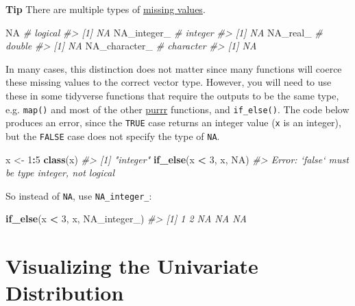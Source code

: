\documentclass[]{book}
\newenvironment{Shaded}{\begin{snugshade}}{\end{snugshade}}
\newcommand{\CommentTok}[1]{\textcolor[rgb]{0.56,0.35,0.01}{\textit{#1}}}
\newcommand{\DecValTok}[1]{\textcolor[rgb]{0.00,0.00,0.81}{#1}}
\newcommand{\KeywordTok}[1]{\textcolor[rgb]{0.13,0.29,0.53}{\textbf{#1}}}
\newcommand{\NormalTok}[1]{#1}
\newcommand{\OperatorTok}[1]{\textcolor[rgb]{0.81,0.36,0.00}{\textbf{#1}}}
\newcommand{\OtherTok}[1]{\textcolor[rgb]{0.56,0.35,0.01}{#1}}
\newcommand{\StringTok}[1]{\textcolor[rgb]{0.31,0.60,0.02}{#1}}
\theoremstyle{definition}
\theoremstyle{definition}
\theoremstyle{definition}
\theoremstyle{remark}
\begin{document}
\textbf{Tip} There are multiple types of
\href{http://r4ds.had.co.nz/vectors.html\#important-types-of-atomic-vector}{missing
values}.

\begin{Shaded}
\begin{Highlighting}[]
\OtherTok{NA}  \CommentTok{# logical}
\CommentTok{#> [1] NA}
\OtherTok{NA_integer_} \CommentTok{# integer}
\CommentTok{#> [1] NA}
\OtherTok{NA_real_} \CommentTok{# double}
\CommentTok{#> [1] NA}
\OtherTok{NA_character_} \CommentTok{# character}
\CommentTok{#> [1] NA}
\end{Highlighting}
\end{Shaded}

In many cases, this distinction does not matter since many functions
will coerce these missing values to the correct vector type. However,
you will need to use these in some tidyverse functions that require the
outputs to be the same type, e.g. \texttt{map()} and most of the other
\href{https://cran.r-project.org/package=purrr}{purrr} functions, and
\texttt{if\_else()}. The code below produces an error, since the
\texttt{TRUE} case returns an integer value (\texttt{x} is an integer),
but the \texttt{FALSE} case does not specify the type of \texttt{NA}.

\begin{Shaded}
\begin{Highlighting}[]
\NormalTok{x <-}\StringTok{ }\DecValTok{1}\OperatorTok{:}\DecValTok{5}
\KeywordTok{class}\NormalTok{(x)}
\CommentTok{#> [1] "integer"}
\KeywordTok{if_else}\NormalTok{(x }\OperatorTok{<}\StringTok{ }\DecValTok{3}\NormalTok{, x, }\OtherTok{NA}\NormalTok{)}
\CommentTok{#> Error: `false` must be type integer, not logical}
\end{Highlighting}
\end{Shaded}

So instead of \texttt{NA}, use \texttt{NA\_integer\_}:

\begin{Shaded}
\begin{Highlighting}[]
\KeywordTok{if_else}\NormalTok{(x }\OperatorTok{<}\StringTok{ }\DecValTok{3}\NormalTok{, x, }\OtherTok{NA_integer_}\NormalTok{)}
\CommentTok{#> [1]  1  2 NA NA NA}
\end{Highlighting}
\end{Shaded}

\hypertarget{visualizing-the-univariate-distribution}{%
\section{Visualizing the Univariate
Distribution}\label{visualizing-the-univariate-distribution}}
\end{document}
